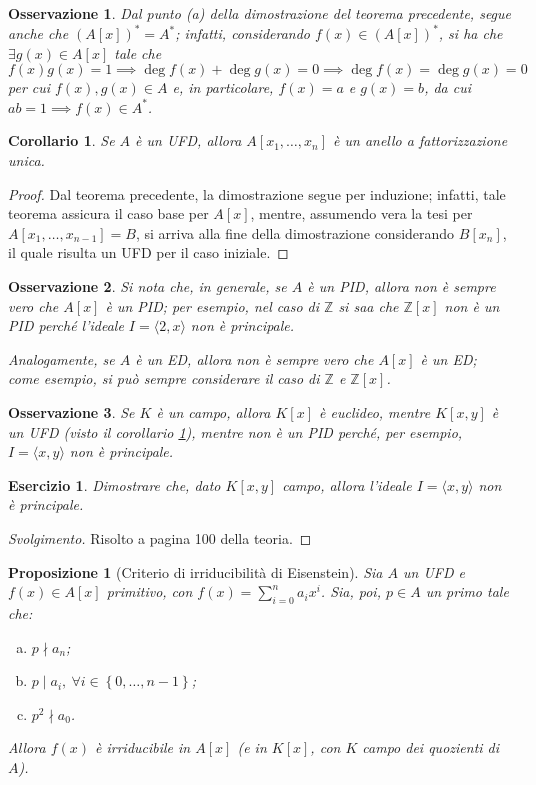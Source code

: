 \documentclass[12pt]{scrartcl}
\theoremstyle{style}
\newtheorem{prop}{Proposizione}[section]
\newtheorem{corollario}{Corollario}[teorema]
\newtheorem{osservazione}{Osservazione}[section]
\newtheorem{esercizio}{Esercizio}[section]
\newenvironment{svolgimento}{\renewcommand\qedsymbol{$\blacksquare$}\begin{proof}[Svolgimento]}{\end{proof}}
\numberwithin{equation}{subsection}
\begin{document}
\begin{osservazione}
	Dal punto (a) della dimostrazione del teorema precedente, segue anche che $(A[x])^* = A^*$; infatti, considerando $f(x) \in (A[x])^*$, si ha che $\exists g(x) \in A[x]$ tale che 
	\[
	f(x) g(x) = 1\implies \operatorname{deg} f(x) + \operatorname{deg} g(x) = 0\implies \operatorname{deg} f(x) = \operatorname{deg} g(x) = 0
	\] 
	per cui $f(x), g(x) \in A$ e, in particolare, $f(x) = a$ e $g(x) = b$, da cui $ab =1\implies f(x) \in A^*$.
\end{osservazione}
\begin{corollario}\label{corufdcat}
	Se $A$ \`e un UFD, allora $A[x_1,\ldots,x_n]$ \`e un anello a fattorizzazione unica.
\end{corollario}
	\begin{proof}
		Dal teorema precedente, la dimostrazione segue per induzione; infatti, tale teorema assicura il caso base per $A[x]$, mentre, assumendo vera la tesi per $A [x_1,\ldots,x_{n-1} ] = B$, si arriva alla fine della dimostrazione considerando $B[x_n]$, il quale risulta un UFD per il caso iniziale.
	\end{proof}
\begin{osservazione}
	Si nota che, in generale, se $A$ \`e un PID, allora non \`e sempre vero che $A[x]$ \`e un PID; per esempio, nel caso di $\mathbb{Z}$ si saa che $\mathbb{Z}[x]$ non \`e un PID perch\'e l'ideale $I = \langle 2,x \rangle$ non \`e principale.

	Analogamente, se $A$ \`e un ED, allora non \`e sempre vero che $A[x]$ \`e un ED; come esempio, si pu\`o sempre considerare il caso di $\mathbb{Z}$ e $\mathbb{Z}[x]$.
\end{osservazione}
\begin{osservazione}
	Se $K$ \`e un campo, allora $K[x]$ \`e euclideo, mentre $K[x,y]$ \`e un UFD (visto il corollario \ref{corufdcat}), mentre non \`e un PID perch\'e, per esempio, $I =\langle x,y \rangle$ non \`e principale.
\end{osservazione}
\begin{esercizio}
	Dimostrare che, dato $K[x,y]$ campo, allora l'ideale $I=\langle x,y \rangle$ non \`e principale.
\end{esercizio}
	\begin{svolgimento}
		Risolto a pagina 100 della teoria.
	\end{svolgimento}
\begin{prop}
	[Criterio di irriducibilit\`a di Eisenstein]
	Sia $A$ un UFD e $f(x) \in A[x]$ primitivo, con $f(x) = \sum_{i=0}^{n} a_ix^i$.
	Sia, poi, $p \in A$ un primo tale che:
	\begin{enumerate}[(a).]
		\item $p\nmid a_n$;
		\item $p  \mid a_i , \ \forall i \in \left\{ 0,\ldots,n-1 \right\} $;
		\item $p^2 \nmid a_0$.
	\end{enumerate}
	Allora $f(x)$ \`e irriducibile in $A[x]$ (e in $K[x]$, con $K$ campo dei quozienti di $A$).
\end{prop}
\newpage
\end{document}
